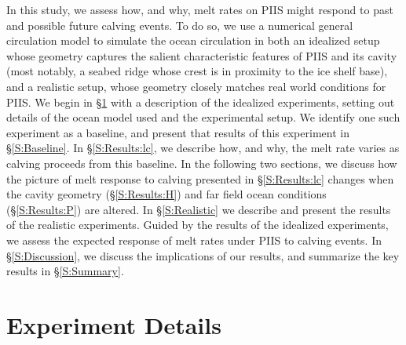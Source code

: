 \documentclass[draft]{agujournal2019}
\begin{document}
In this study, we assess how, and why, melt rates on PIIS might respond to past and possible future calving events. To do so, we use a numerical general circulation model to simulate the ocean circulation in both an idealized setup whose geometry captures the salient characteristic features of PIIS and its cavity (most notably, a seabed ridge whose crest is in proximity to the ice shelf base), and a realistic setup, whose geometry closely matches real world conditions for PIIS. We begin in \S\ref{S:Experiment} with a description of the idealized experiments, setting out details of the ocean model used and the experimental setup. We identify one such experiment as a baseline, and present that results of this experiment in \S\ref{S:Baseline}. In \S\ref{S:Results:lc}, we describe how, and why, the melt rate varies as calving proceeds from this baseline. In the following two sections, we discuss how the picture of melt response to calving presented in \S\ref{S:Results:lc} changes when the cavity geometry (\S\ref{S:Results:H}) and far field ocean conditions (\S\ref{S:Results:P}) are altered. In \S\ref{S:Realistic} we describe and present the results of  the realistic experiments. Guided by the results of the idealized experiments, we assess the expected response of melt rates under PIIS to calving events. In \S\ref{S:Discussion}, we discuss the implications of our results, and summarize the key results in \S\ref{S:Summary}.


\section{Experiment Details}\label{S:Experiment}
\end{document}
